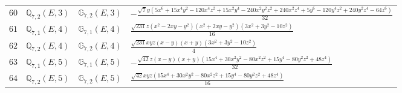 \documentclass[fleqn,8pt,landscape]{jsarticle}
\begin{document}
\begin{table}[ht!]
\begin{center}
\begin{tabular}{cccl}
$ 60 $ & $ \mathbb{Q}_{7,2}(E,3) $ & $ \mathbb{G}_{7,2}(E,3) $ & $ - \frac{\sqrt{7} y \left(5 x^{6} + 15 x^{4} y^{2} - 120 x^{4} z^{2} + 15 x^{2} y^{4} - 240 x^{2} y^{2} z^{2} + 240 x^{2} z^{4} + 5 y^{6} - 120 y^{4} z^{2} + 240 y^{2} z^{4} - 64 z^{6}\right)}{32} $ \\
$ 61 $ & $ \mathbb{Q}_{7,1}(E,4) $ & $ \mathbb{G}_{7,1}(E,4) $ & $ \frac{\sqrt{231} z \left(x^{2} - 2 x y - y^{2}\right) \left(x^{2} + 2 x y - y^{2}\right) \left(3 x^{2} + 3 y^{2} - 10 z^{2}\right)}{16} $ \\
$ 62 $ & $ \mathbb{Q}_{7,2}(E,4) $ & $ \mathbb{G}_{7,2}(E,4) $ & $ \frac{\sqrt{231} x y z \left(x - y\right) \left(x + y\right) \left(3 x^{2} + 3 y^{2} - 10 z^{2}\right)}{4} $ \\
$ 63 $ & $ \mathbb{Q}_{7,1}(E,5) $ & $ \mathbb{G}_{7,1}(E,5) $ & $ - \frac{\sqrt{42} z \left(x - y\right) \left(x + y\right) \left(15 x^{4} + 30 x^{2} y^{2} - 80 x^{2} z^{2} + 15 y^{4} - 80 y^{2} z^{2} + 48 z^{4}\right)}{32} $ \\
$ 64 $ & $ \mathbb{Q}_{7,2}(E,5) $ & $ \mathbb{G}_{7,2}(E,5) $ & $ \frac{\sqrt{42} x y z \left(15 x^{4} + 30 x^{2} y^{2} - 80 x^{2} z^{2} + 15 y^{4} - 80 y^{2} z^{2} + 48 z^{4}\right)}{16} $ \\
 \hline \hline
\end{tabular}
\end{center}
\end{table}
\end{document}
